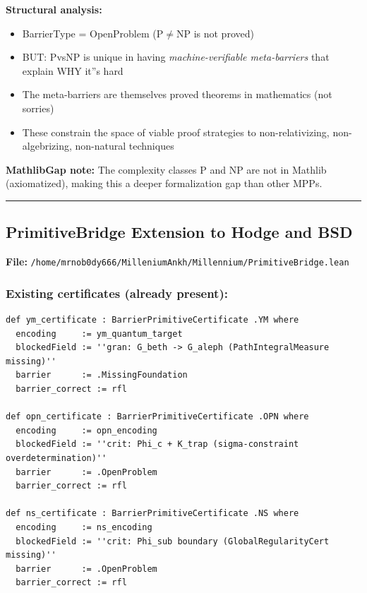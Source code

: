 \documentclass[12pt,a4paper]{article}
\begin{document}
\textbf{Structural analysis:}

\begin{itemize}
    \item BarrierType = OpenProblem (P$\neq$NP is not proved)
    \item BUT: PvsNP is unique in having \emph{machine-verifiable meta-barriers} that explain WHY it''s hard
    \item The meta-barriers are themselves proved theorems in mathematics (not sorries)
    \item These constrain the space of viable proof strategies to non-relativizing, non-algebrizing, non-natural techniques
\end{itemize}

\textbf{MathlibGap note:} The complexity classes P and NP are not in Mathlib (axiomatized), making this a deeper formalization gap than other MPPs.

\begin{center}
\rule{0.5\textwidth}{0.4pt}
\end{center}

\subsection{PrimitiveBridge Extension to Hodge and BSD}

\textbf{File:} \texttt{/home/mrnob0dy666/MilleniumAnkh/Millennium/PrimitiveBridge.lean}

\subsubsection{Existing certificates (already present):}

\begin{lstlisting}[language=lean]
def ym_certificate : BarrierPrimitiveCertificate .YM where
  encoding     := ym_quantum_target
  blockedField := ''gran: G_beth -> G_aleph (PathIntegralMeasure missing)''
  barrier      := .MissingFoundation
  barrier_correct := rfl

def opn_certificate : BarrierPrimitiveCertificate .OPN where
  encoding     := opn_encoding
  blockedField := ''crit: Phi_c + K_trap (sigma-constraint overdetermination)''
  barrier      := .OpenProblem
  barrier_correct := rfl

def ns_certificate : BarrierPrimitiveCertificate .NS where
  encoding     := ns_encoding
  blockedField := ''crit: Phi_sub boundary (GlobalRegularityCert missing)''
  barrier      := .OpenProblem
  barrier_correct := rfl
\end{lstlisting}
\end{document}

